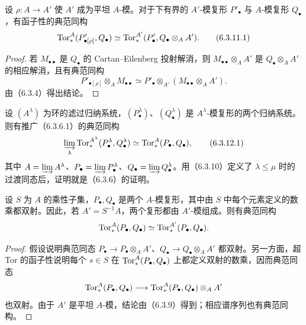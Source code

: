 设 $\rho:A\to A'$ 使 $A'$ 成为平坦 $A$-模。对于下有界的 $A'$-模复形 $P'_\bullet$ 与 $A$-模复形 $Q_\bullet$，有函子性的典范同构
\begin{equation}
 \operatorname{Tor}_*^A(P'_{\bullet[\rho]},Q_\bullet)
 \simeq\operatorname{Tor}_*^{A'}(P'_\bullet,Q_\bullet\otimes_AA').\tag{6.3.11.1}
\end{equation}
\begin{proof}
若 $M_{\bullet\bullet}$ 是 $Q_\bullet$ 的 Cartan--Eilenberg 投射解消，则 $M_{\bullet\bullet}\otimes_AA'$ 是 $Q_\bullet\otimes_AA'$ 的相应解消，且有典范同构
\[
 P'_{\bullet[\rho]}\otimes_AM_{\bullet\bullet}
 \simeq P'_\bullet\otimes_{A'}(M_{\bullet\bullet}\otimes_AA').
\]
由（6.3.4）得出结论。
\end{proof}

设 $(A^\lambda)$ 为环的滤过归纳系统，$(P_\bullet^\lambda)$、$(Q_\bullet^\lambda)$ 是 $A^\lambda$-模复形的两个归纳系统。则有推广（6.3.6.1）的典范同构
\begin{equation}
 \varinjlim_\lambda\operatorname{Tor}_*^{A^\lambda}(P_\bullet^\lambda,Q_\bullet^\lambda)
 \simeq\operatorname{Tor}_*^A(P_\bullet,Q_\bullet),\tag{6.3.12.1}
\end{equation}
其中 $A=\varinjlim A^\lambda$、$P_\bullet=\varinjlim P_\bullet^\lambda$、$Q_\bullet=\varinjlim Q_\bullet^\lambda$。用（6.3.10）定义了 $\lambda\leq\mu$ 时的过渡同态后，证明就是（6.3.6）的证明。

设 $S$ 为 $A$ 的乘性子集，$P_\bullet,Q_\bullet$ 是两个 $A$-模复形，其中由 $S$ 中每个元素定义的数乘都双射。因此，若 $A'=S^{-1}A$，两个复形都由 $A'$-模组成。则有典范同构
\[
 \operatorname{Tor}_*^A(P_\bullet,Q_\bullet)\simeq\operatorname{Tor}_*^{A'}(P_\bullet,Q_\bullet).
\]
\begin{proof}
假设说明典范同态 $P_\bullet\to P_\bullet\otimes_AA'$、$Q_\bullet\to Q_\bullet\otimes_AA'$ 都双射。另一方面，超 Tor 的函子性说明每个 $s\in S$ 在 $\operatorname{Tor}_*^A(P_\bullet,Q_\bullet)$ 上都定义双射的数乘，因而典范同态
\[
 \operatorname{Tor}_*^A(P_\bullet,Q_\bullet)
 \longrightarrow\operatorname{Tor}_*^A(P_\bullet,Q_\bullet)\otimes_AA'
\]
也双射。由于 $A'$ 是平坦 $A$-模，结论由（6.3.9）得到；相应谱序列也有典范同构。
\end{proof}
